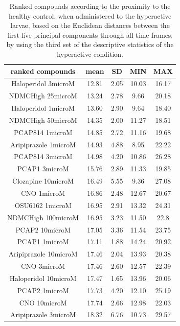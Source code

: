 \documentclass[a4paper,12pt]{article}
\begin{document}
\begin{table}[h!]\tiny
\centering
\caption{Ranked compounds according to the proximity to the healthy control, when administered to the hyperactive larvae, based on the Euclidean distances between the first five principal components through all time frames, by using the third set of the descriptive statistics of the hyperactive condition.}
\begin{tabular}{|c|c|c|c|c|}
\hline
ranked compounds             & mean & SD   & MIN  & MAX   \\ \hline
Haloperidol 3microM   & 12.81 & 2.05  & 10.03 & 16.17 \\ \hline
NDMCHigh 25microM     & 13.24 & 2.78  & 9.66  & 20.18 \\ \hline
Haloperidol 1microM   & 13.60  & 2.90   & 9.64  & 18.40  \\ \hline
NDMCHigh 50microM     & 14.35 & 2.00     & 11.27 & 18.51 \\ \hline
PCAP814 1microM       & 14.85 & 2.72  & 11.16 & 19.68 \\ \hline
Aripiprazole 1microM  & 14.93 & 4.88  & 8.95  & 22.22 \\ \hline
PCAP814 3microM       & 14.98 & 4.20   & 10.86 & 26.28 \\ \hline
PCAP1 3microM         & 15.76 & 2.89  & 11.33 & 19.85 \\ \hline
Clozapine 10microM    & 16.49 & 5.55  & 9.36  & 27.08 \\ \hline
CNO 1microM           & 16.86 & 2.48  & 12.67 & 20.67 \\ \hline
OSU6162 1microM       & 16.95 & 2.91  & 13.32 & 24.31 \\ \hline
NDMCHigh 100microM    & 16.95 & 3.23  & 11.50  & 22.8  \\ \hline
PCAP2 10microM        & 17.05 & 3.36  & 11.54 & 23.75 \\ \hline
PCAP1 1microM         & 17.11 & 1.88  & 14.24 & 20.92 \\ \hline
Aripiprazole 10microM & 17.46 & 2.04  & 13.93 & 20.38 \\ \hline
CNO 3microM           & 17.46 & 2.60   & 12.57 & 22.39 \\ \hline
Haloperidol 10microM  & 17.47 & 1.65  & 13.96 & 20.06 \\ \hline
PCAP2 1microM         & 17.73 & 4.20   & 12.10  & 25.19 \\ \hline
CNO 10microM          & 17.74 & 2.66  & 12.98 & 22.03 \\ \hline
Aripiprazole 3microM  & 18.32 & 6.76  & 10.73 & 29.57 \\ \hline

\end{tabular}
\end{table}
\end{document}
